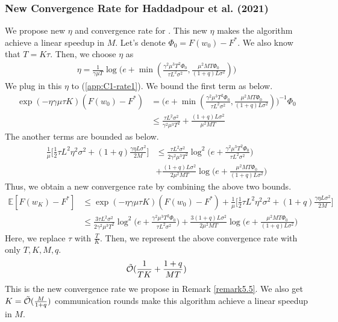 
\subsubsection{New Convergence Rate for Haddadpour et al. (2021)}

We propose new $\eta$ and convergence rate for \cite{haddadpour2021federated}. This new $\eta$ makes the algorithm achieve a linear speedup in $M$. Let's denote $\Phi_0 = F(w_0) - F^*$. We also know that $T = K\tau$. Then, we choose $\eta$ as
\begin{align*}
    \eta = \frac{1}{\gamma\mu T}\log \Big( e+ \min (\frac{\gamma^2\mu^3 T^2 \Phi_0}{\tau L^2\sigma^2}, \frac{\mu^2 MT\Phi_0}{(1+q)L\sigma^2})\Big)
\end{align*}
We plug in this $\eta$ to (\ref{app:C1-rate1}). We bound the first term as below.
\begin{align*}
    \exp(-\eta\gamma\mu\tau K)(F(w_0) - F^*) &= \Big( e+ \min (\frac{\gamma^2\mu^3 T^2 \Phi_0}{\tau L^2\sigma^2}, \frac{\mu^2 MT\Phi_0}{(1+q)L\sigma^2})\Big)^{-1} \Phi_0 \\
    &\leq \frac{\tau L^2\sigma^2}{\gamma^2\mu^3 T^2} + \frac{(1+q)L\sigma^2}{\mu^2 MT}
\end{align*}
The another terms are bounded as below.
\begin{align*}
    \frac{1}{\mu}\Big[\frac{1}{2}\tau L^2\eta^2\sigma^2 + (1+q)\frac{\gamma\eta L\sigma^2}{2M}\Big] &\leq \frac{\tau L^2\sigma^2}{2\gamma^2\mu^3 T^2} \log^2 \Big( e+\frac{\gamma^2\mu^3 T^2\Phi_0}{\tau L^2\sigma^2}\Big) \\
    &+ \frac{(1+q)L\sigma^2}{2\mu^2 MT}\log\Big( e+ \frac{\mu^2 MT\Phi_0}{(1+q)L\sigma^2}\Big)
\end{align*}
Thus, we obtain a new convergence rate by combining the above two bounds.
\begin{align*}
    \mathbb{E}[F(w_K)- F^*] &\leq \exp(-\eta\gamma\mu\tau K)(F(w_0) - F^*) + \frac{1}{\mu}\Big[\frac{1}{2}\tau L^2\eta^2\sigma^2 + (1+q)\frac{\gamma\eta L\sigma^2}{2M}\Big] \\
    &\leq \frac{3\tau L^2\sigma^2}{2\gamma^2\mu^3 T^2} \log^2 \Big( e+\frac{\gamma^2\mu^3 T^2\Phi_0}{\tau L^2\sigma^2}\Big) + \frac{3(1+q)L\sigma^2}{2\mu^2 MT}\log\Big( e+ \frac{\mu^2 MT\Phi_0}{(1+q)L\sigma^2}\Big)
\end{align*}
Here, we replace $\tau$ with $\frac{T}{K}$. Then, we represent the above convergence rate with only $T, K, M, q$.
\begin{gather*}
    \Tilde{\mathcal{O}}(\frac{1}{TK} + \frac{1+q}{MT})
\end{gather*}
This is the new convergence rate we propose in Remark \ref{remark5.5}. We also get $K = \Tilde{\mathcal{O}}(\frac{M}{1+q})$ communication rounds make this algorithm achieve a linear speedup in $M$.

